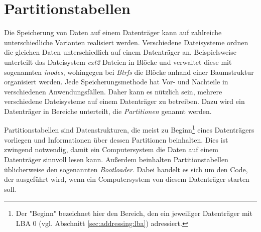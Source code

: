 \section{Partitionstabellen}
Die Speicherung von Daten auf einem Datenträger kann auf zahlreiche unterschiedliche Varianten realisiert werden.
Verschiedene Dateisysteme ordnen die gleichen Daten unterschiedlich auf einem Datenträger an.
Beispielsweise unterteilt das Dateisystem \textit{ext2} Dateien in Blöcke und verwaltet diese mit sogenannten \textit{inodes}, wohingegen bei \textit{Btrfs} die Blöcke anhand einer Baumstruktur organisiert werden. 
Jede Speicherungsmethode hat Vor- und Nachteile in verschiedenen Anwendungsfällen. 
Daher kann es nützlich sein, mehrere verschiedene Dateisysteme auf einem Datenträger zu betreiben.
Dazu wird ein Datenträger in Bereiche unterteilt, die \textit{Partitionen} genannt werden.

Partitionstabellen sind Datenstrukturen, die meist zu Beginn\footnote{
    Der "Beginn" bezeichnet hier den Bereich, den ein jeweiliger Datenträger mit LBA 0 (vgl. Abschnitt \ref{sec:addressing:lba}) adressiert.
}
eines Datenträgers vorliegen und Informationen über dessen Partitionen beinhalten.
Dies ist zwingend notwendig, damit ein Computersystem die Daten auf einem Datenträger sinnvoll lesen kann.
Außerdem beinhalten Partitionstabellen üblicherweise den sogenannten \textit{Bootloader}. Dabei handelt es sich um den Code, der ausgeführt wird, wenn ein Computersystem von diesem Datenträger starten soll.